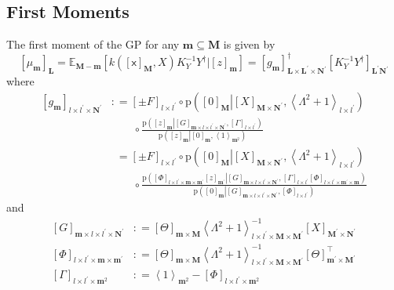 \documentclass[preprint,12pt]{elsarticle}
\newcommand*{\M}[1]{\ensuremath{#1}\xspace}
\newcommand*{\x}{\times}
\newcommand*{\mi}[1]{\mathbf{#1}}
\newcommand*{\rv}[1]{\mathsf{#1}}
\newcommand*{\te}[2][]{\left\lbrack{#2}\right\rbrack_{#1}}
\newcommand*{\diag}[2][]{\left\langle{#2}\right\rangle_{#1}}
\newcommand*{\prob}[3]{\M{\mathrm{p}\!\left(\left.{#1}\right\vert{#2,#3}\right)}}
\newcommand*{\deq}{\M{\mathrel{\mathop:}=}}
\newcommand*{\ev}[3][]{\mathbb{E}_{#3}^{#1}\!\left\lbrack{#2}\right\rbrack}
\begin{document}
    \subsection{First Moments} \label{sub:GPMom:First}
        The first moment of the GP for any $\mi{m}\subseteq\mi{M}$ is given by
        \begin{equation*}
            \te[\mi{L}]{\mu_{\mi{m}}}
            = \ev{k\!\left(\te[\mi{M}]{\rv{x}},X\right) K_{Y}^{-1} Y^{\dagger} \big\vert \te[\mi{m}]{z}}{\mi{M-m}}
            = \te[\mi{L}\x\mi{L^{\prime}}\x\mi{N^{\prime}}]{g_{\mi{m}}}^{\dagger}
            \te[\mi{L^{\prime}N^{\prime}}]{K_{Y}^{-1} Y^{\dagger}}
        \end{equation*}
        where
        \begin{equation*}
            \begin{aligned}
                \te[l\x l^{\prime}\x\mi{N^{\prime}}]{g_{\mi{m}}} 
                &\deq \te[l\x l^{\prime}]{\pm F} \circ 
                \prob{\te[\mi{M}]{0}}{\te[\mi{M}\x\mi{N^{\prime}}]{X}}
                {\diag[l\x l^{\prime}]{\Lambda^{2}+1}} \\
                & \phantom{\deq\ } \circ \frac
                {\prob{\te[\mi{m}]{z}}{\te[\mi{m}\x l\x l^{\prime}\x\mi{N^{\prime}}]{G}}{\te[l\x l^{\prime}]{\Gamma}}}
                {\prob{\te[\mi{m}]{z}}{\te[\mi{m}]{0}}{\diag[\mi{m}^{2}]{1}}} \\
                &\phantom{:}= \te[l\x l^{\prime}]{\pm F} \circ 
                \prob{\te[\mi{M}]{0}}{\te[\mi{M}\x\mi{N^{\prime}}]{X}}
                {\diag[l\x l^{\prime}]{\Lambda^{2}+1}} \\ 
                & \phantom{\deq\ } \circ \frac{
                {\prob{\te[l\x l^{\prime}\x\mi{m\x m^{\prime}}]{\Phi}\te[\mi{m^{\prime}}]{z}}{\te[\mi{m}\x l\x l^{\prime}\x\mi{N^{\prime}}]{G}}
                {\te[l\x l^{\prime}]{\Gamma}\te[l\x l^{\prime}\x \mi{m^{\prime}\x m}]{\Phi}}}}
                {\prob{\te[\mi{m}]{0}}{\te[\mi{m}\x l\x l^{\prime}\x\mi{N^{\prime}}]{G}}
                {\te[l\x l^{\prime}]{\Phi}}}
            \end{aligned}                    
        \end{equation*}
        and
        \begin{equation*}
            \begin{aligned}
                \te[\mi{m}\x l\x l^{\prime}\x\mi{N^{\prime}}]{G} &\deq 
                \te[\mi{m}\x\mi{M}]{\Theta} \diag[l\x l^{\prime}\x\mi{M}\x\mi{M^{\prime}}]{\Lambda^{2}+1}^{-1} \te[\mi{M^{\prime}}\x\mi{N^{\prime}}]{X} \\
                \te[l\x l^{\prime}\x\mi{m}\x\mi{m^{\prime}}]{\Phi} &\deq 
                \te[\mi{m}\x\mi{M}]{\Theta}
                \diag[l\x l^{\prime}\x\mi{M}\x\mi{M^{\prime}}]{\Lambda^{2}+1}^{-1} \te[\mi{m^{\prime}}\x\mi{M^{\prime}}]{\Theta}^{\intercal} \\
                \te[l\x l^{\prime}\x\mi{m}^{2}]{\Gamma} &\deq 
                \diag[\mi{m}^{2}]{1} -
                \te[l\x l^{\prime}\x\mi{m}^{2}]{\Phi}
            \end{aligned}
        \end{equation*}
\end{document}

